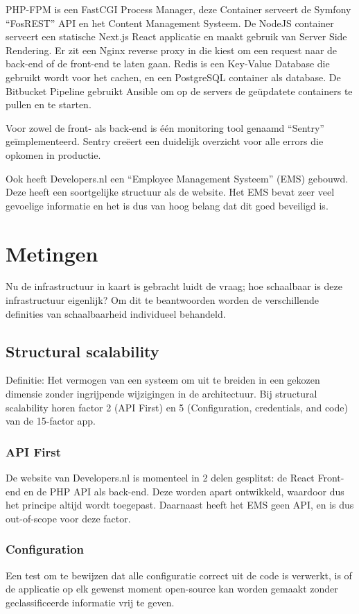 PHP-FPM is een FastCGI Process Manager, deze Container serveert de Symfony “FosREST” API en het Content Management Systeem. De NodeJS container serveert een statische Next.js React applicatie en maakt gebruik van Server Side Rendering. Er zit een Nginx reverse proxy in die kiest om een request naar de back-end of de front-end te laten gaan. Redis is een Key-Value Database die gebruikt wordt voor het cachen, en een PostgreSQL container als database. De Bitbucket Pipeline gebruikt Ansible om op de servers de geüpdatete containers te pullen en te starten.

Voor zowel de front- als back-end is één monitoring tool genaamd \enquote{Sentry} geïmplementeerd. Sentry creëert een duidelijk overzicht voor alle errors die opkomen in productie.

Ook heeft Developers.nl een \enquote{Employee Management Systeem} (EMS) gebouwd. Deze heeft een soortgelijke structuur als de website. Het EMS bevat zeer veel gevoelige informatie en het is dus van hoog belang dat dit goed beveiligd is.

\section{Metingen}

Nu de infrastructuur in kaart is gebracht luidt de vraag; hoe schaalbaar is deze infrastructuur eigenlijk? Om dit te beantwoorden worden de verschillende definities van schaalbaarheid individueel behandeld.

\subsection{Structural scalability}
Definitie: Het vermogen van een systeem om uit te breiden in een gekozen dimensie zonder ingrijpende wijzigingen in de architectuur. Bij structural scalability horen factor 2 (API First) en 5 (Configuration, credentials, and code) van de 15-factor app.

\subsubsection{API First}
De website van Developers.nl is momenteel in 2 delen gesplitst: de React Front-end en de PHP API als back-end. Deze worden apart ontwikkeld, waardoor dus het principe altijd wordt toegepast. Daarnaast heeft het EMS geen API, en is dus out-of-scope voor deze factor.

\subsubsection{Configuration}
Een test om te bewijzen dat alle configuratie correct uit de code is verwerkt, is of de applicatie op elk gewenst moment open-source kan worden gemaakt zonder geclassificeerde informatie vrij te geven.


